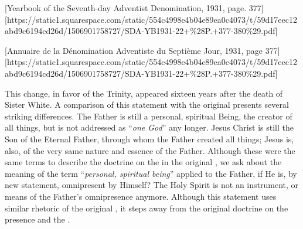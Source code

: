 



[Yearbook of the Seventh-day Adventist Denomination, 1931, page. 377][https://static1.squarespace.com/static/554c4998e4b04e89ea0c4073/t/59d17eec12abd9c6194cd26d/1506901758727/SDA-YB1931-22+\%28P.+377-380\%29.pdf]


[Annuaire de la Dénomination Adventiste du Septième Jour, 1931, page 377][https://static1.squarespace.com/static/554c4998e4b04e89ea0c4073/t/59d17eec12abd9c6194cd26d/1506901758727/SDA-YB1931-22+\%28P.+377-380\%29.pdf]


This change, in favor of the Trinity, appeared sixteen years after the death of Sister White. A comparison of this statement with the original  presents several striking differences. The Father is still a personal, spiritual Being, the creator of all things, but is not addressed as “\textit{one God}” any longer. Jesus Christ is still the Son of the Eternal Father, through whom the Father created all things; Jesus is, also, of the very same nature and essence of the Father. Although these were the same terms to describe the doctrine on the  in the original , we ask about the meaning of the term “\textit{personal, spiritual being}” applied to the Father, if He is, by new statement, omnipresent by Himself? The Holy Spirit is not an instrument, or means of the Father’s omnipresence anymore. Although this statement uses similar rhetoric of the original , it steps away from the original doctrine on the presence and the .


